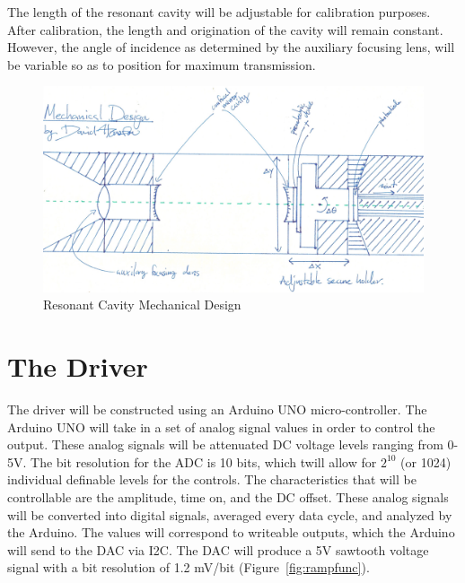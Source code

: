 \documentclass[12pt]{report}
\begin{document}
The length of the resonant cavity will be adjustable for calibration purposes. After calibration, the length and origination of the cavity will remain constant. However, the angle of incidence as determined by the auxiliary focusing lens, will be variable so as to position for maximum transmission. 

\begin{figure}[h!]
	\centering
	\includegraphics[width=\textwidth]{holder.jpeg}
	\caption{Resonant Cavity Mechanical Design}
	\label{fig:lensholder} 
\end{figure}

\section{The Driver}
The driver will be constructed using an Arduino UNO micro-controller. The Arduino UNO will take in a set of analog signal values in order to control the output. These analog signals will be attenuated DC voltage levels ranging from 0-5V. The bit resolution for the ADC is 10 bits, which twill allow for $2^{10}$ (or 1024) individual definable levels for the controls. The characteristics that will be controllable are the amplitude, time on, and the DC offset. These analog signals will be converted into digital signals, averaged every data cycle, and analyzed by the Arduino. The values will correspond to writeable outputs, which the Arduino will send to the DAC via I2C. The DAC will produce a 5V sawtooth voltage signal with a bit resolution of 1.2 mV/bit (Figure~\ref{fig:rampfunc}). 
\end{document}
